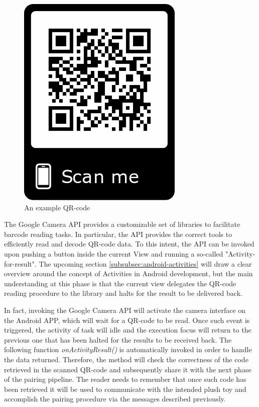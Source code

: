 \begin{figure}[ht]
    \centering
    \includegraphics[scale=0.4]{images/frame.png}
    \caption{An example QR-code}
    \label{fig:SE_qrcode}
\end{figure}

\medskip
The Google Camera API provides a customizable set of libraries to facilitate barcode reading tasks. In particular, the API provides the correct tools to efficiently read and decode QR-code data. To this intent, the API can be invoked upon pushing a button inside the current View and running a so-called "Activity-for-result". The upcoming section \ref{subsubsec:android-activities} will draw a clear overview around the concept of Activities in Android development, but the main understanding at this phase is that the current view delegates the QR-code reading procedure to the library and halts for the result to be delivered back.

\vspace{0.5cm}

\vspace{0.5cm}

In fact, invoking the Google Camera API will activate the camera interface on the Android APP, which will wait for a QR-code to be read. Once such event is triggered, the activity of task will idle and the execution focus will return to the previous one that has been halted for the results to be received back. The following function \textit{onActivityResult()} is automatically invoked in order to handle the data returned. Therefore, the method will check the correctness of the code retrieved in the scanned QR-code and subsequently share it with the next phase of the pairing pipeline. The reader needs to remember that once such code has been retrieved it will be used to communicate with the intended plush toy and accomplish the pairing procedure via the messages described previously.

